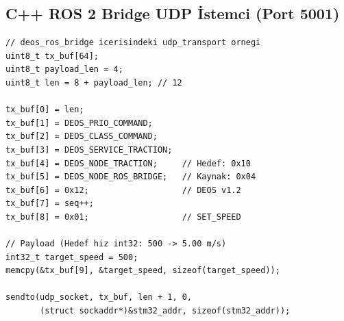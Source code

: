 \documentclass[a4paper,10pt]{article}
\begin{document}
\subsection{C++ ROS 2 Bridge UDP İstemci (Port 5001)}
\begin{lstlisting}[style=cstyle]
// deos_ros_bridge icerisindeki udp_transport ornegi
uint8_t tx_buf[64];
uint8_t payload_len = 4;
uint8_t len = 8 + payload_len; // 12

tx_buf[0] = len;
tx_buf[1] = DEOS_PRIO_COMMAND;
tx_buf[2] = DEOS_CLASS_COMMAND;
tx_buf[3] = DEOS_SERVICE_TRACTION;
tx_buf[4] = DEOS_NODE_TRACTION;     // Hedef: 0x10
tx_buf[5] = DEOS_NODE_ROS_BRIDGE;   // Kaynak: 0x04
tx_buf[6] = 0x12;                   // DEOS v1.2
tx_buf[7] = seq++;
tx_buf[8] = 0x01;                   // SET_SPEED

// Payload (Hedef hiz int32: 500 -> 5.00 m/s)
int32_t target_speed = 500;
memcpy(&tx_buf[9], &target_speed, sizeof(target_speed));

sendto(udp_socket, tx_buf, len + 1, 0, 
       (struct sockaddr*)&stm32_addr, sizeof(stm32_addr));
\end{lstlisting}
\end{document}
